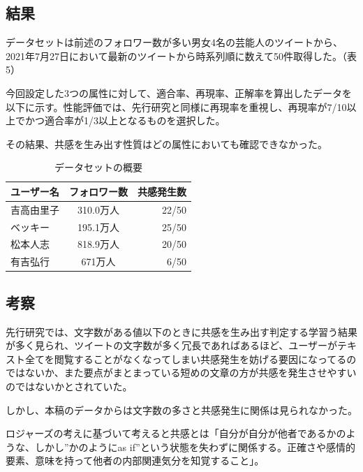 \documentclass[dvipdfmx]{issj}
\begin{document}
\subsection{結果}  %
データセットは前述のフォロワー数が多い男女4名の芸能人のツイートから、2021年7月27日において最新のツイートから時系列順に数えて50件取得した。（表5）

今回設定した3つの属性に対して、適合率、再現率、正解率を算出したデータを以下に示す。性能評価では、先行研究と同様に再現率を重視し、再現率が7/10以上でかつ適合率が1/3以上となるものを選択した。

その結果、共感を生み出す性質はどの属性においても確認できなかった。





\begin{table}[hbtp]
  \caption{データセットの概要}
  \label{table:data_type}
  \centering
  \begin{tabular}{lcr}
    \hline
   ユーザー名 & フォロワー数  &  共感発生数  \\
    \hline \hline
吉高由里子 & 310.0万人 &  22/50  \\
ベッキー & 195.1万人 &  25/50  \\
松本人志 & 818.9万人 &  20/50  \\
有吉弘行 & 671万人 &  6/50 \\
    \hline
  \end{tabular}
\end{table}




\subsection{考察}  %
先行研究では、文字数がある値以下のときに共感を生み出す判定する学習う結果が多く見られ、ツイートの文字数が多く冗長であればあるほど、ユーザーがテキスト全てを閲覧することがなくなってしまい共感発生を妨げる要因になってるのではないか、また要点がまとまっている短めの文章の方が共感を発生させやすいのではないかとされていた。

しかし、本稿のデータからは文字数の多さと共感発生に関係は見られなかった。

ロジャーズの考えに基づいて考えると共感とは「自分が自分が他者であるかのような、しかし”かのようにas if”という状態を失わずに関係する。正確さや感情的要素、意味を持って他者の内部関連気分を知覚すること」。
\end{document}
